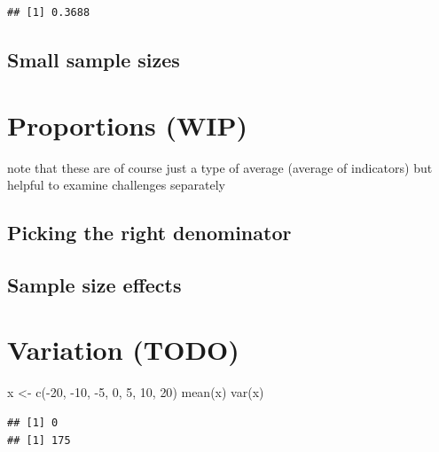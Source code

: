 \documentclass[
]{krantz}
\makeatletter
\newenvironment{Shaded}{\begin{snugshade}}{\end{snugshade}}
\newcommand{\DecValTok}[1]{\textcolor[rgb]{0.06,0.06,0.06}{#1}}
\newcommand{\FunctionTok}[1]{\textcolor[rgb]{0,0,0}{#1}}
\newcommand{\NormalTok}[1]{#1}
\newcommand{\OtherTok}[1]{\textcolor[rgb]{0.37,0.37,0.37}{#1}}
\newcommand{\SpecialCharTok}[1]{\textcolor[rgb]{0,0,0}{#1}}
\newenvironment{kframe}{%
\medskip{}
\setlength{\fboxsep}{.8em}
 \def\at@end@of@kframe{}%
 \ifinner\ifhmode%
  \def\at@end@of@kframe{\end{minipage}}%
  \begin{minipage}{\columnwidth}%
 \fi\fi%
 \def\FrameCommand##1{\hskip\@totalleftmargin \hskip-\fboxsep
 \colorbox{shadecolor}{##1}\hskip-\fboxsep
     \hskip-\linewidth \hskip-\@totalleftmargin \hskip\columnwidth}%
 \MakeFramed {\advance\hsize-\width
   \@totalleftmargin\z@ \linewidth\hsize
   \@setminipage}}%
 {\par\unskip\endMakeFramed%
 \at@end@of@kframe}
\renewenvironment{Shaded}{\begin{kframe}}{\end{kframe}}
\makeatother
\begin{document}
\begin{verbatim}
## [1] 0.3688
\end{verbatim}

\hypertarget{small-sample-sizes}{%
\subsection{Small sample sizes}\label{small-sample-sizes}}

\hypertarget{proportions-wip}{%
\section{Proportions (WIP)}\label{proportions-wip}}

note that these are of course just a type of average (average of indicators) but helpful to examine challenges separately

\hypertarget{picking-the-right-denominator}{%
\subsection{Picking the right denominator}\label{picking-the-right-denominator}}

\hypertarget{sample-size-effects}{%
\subsection{Sample size effects}\label{sample-size-effects}}

\hypertarget{variation-todo}{%
\section{Variation (TODO)}\label{variation-todo}}

\begin{Shaded}
\begin{Highlighting}[]
\NormalTok{x }\OtherTok{\textless{}{-}} \FunctionTok{c}\NormalTok{(}\SpecialCharTok{{-}}\DecValTok{20}\NormalTok{, }\SpecialCharTok{{-}}\DecValTok{10}\NormalTok{, }\SpecialCharTok{{-}}\DecValTok{5}\NormalTok{, }\DecValTok{0}\NormalTok{, }\DecValTok{5}\NormalTok{, }\DecValTok{10}\NormalTok{, }\DecValTok{20}\NormalTok{)}
\FunctionTok{mean}\NormalTok{(x)}
\FunctionTok{var}\NormalTok{(x)}
\end{Highlighting}
\end{Shaded}

\begin{verbatim}
## [1] 0
## [1] 175
\end{verbatim}
\end{document}
